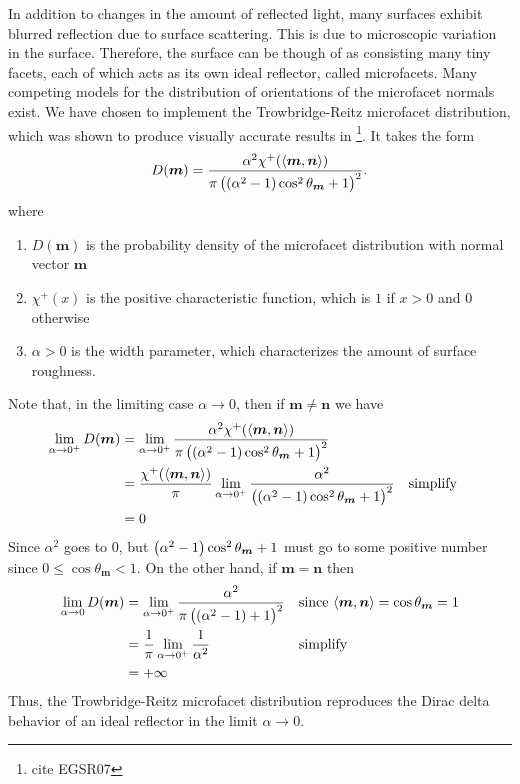\documentclass[12pt]{article}
\DeclarePairedDelimiter\ip{\langle }{\rangle}
\begin{document}
In addition to changes in the amount of reflected light, many surfaces exhibit blurred reflection due to surface scattering.
This is due to microscopic variation in the surface.
Therefore, the surface can be though of as consisting many tiny facets, each of which acts as its own ideal reflector, called microfacets.
Many competing models for the distribution of orientations of the microfacet normals exist.
We have chosen to implement the Trowbridge-Reitz microfacet distribution, which was shown to produce visually accurate results in \footnote{cite EGSR07}.
It takes the form
\[D(\bm m) = \frac{\alpha^2 \chi^+(\ip{\bm m, \bm n})}{\pi\del{\del{\alpha^2 - 1}\cos^2 \theta_{\bm m} + 1}^2}.\]
where
\begin{enumerate}
\item \(D(\bm m)\) is the probability density of the microfacet distribution with normal vector \(\bm m\)
\item \(\chi^+(x)\) is the positive characteristic function, which is \(1\) if \(x>0\) and \(0\) otherwise
\item \(\alpha > 0\) is the width parameter, which characterizes the amount of surface roughness.
\end{enumerate}
Note that, in the limiting case \(\alpha \to 0\), then if \(\bm m \neq \bm n\) we have
\begin{align*}
  \lim_{\alpha \to 0^+}D(\bm m)
  &= \lim_{\alpha \to 0^+}\frac{\alpha^2 \chi^+(\ip{\bm m, \bm n})}{\pi\del{\del{\alpha^2 - 1}\cos^2 \theta_{\bm m} + 1}^2}\\
  &= \frac{ \chi^+(\ip{\bm m, \bm n})}{\pi}\lim_{\alpha \to 0^+}\frac{\alpha^2}{\del{\del{\alpha^2 - 1}\cos^2 \theta_{\bm m} + 1}^2} && \text{simplify}\\
  &= 0
\end{align*}
Since \(\alpha^2\) goes to \(0\), but \(\del{\alpha^2 - 1}\cos^2 \theta_{\bm m} + 1\) must go to some positive number since \(0 \leq \cos\theta_{\bm m} < 1\).
On the other hand, if \(\bm m = \bm n\) then
\begin{align*}
  \lim_{\alpha \to 0}D(\bm m)
  &= \lim_{\alpha \to 0^+}\frac{\alpha^2}{\pi\del{\del{\alpha^2 - 1} + 1}^2} && \text{since \(\ip{\bm m, \bm n} = \cos \theta_{\bm m} = 1\)}\\
  &= \frac{1}{\pi}\lim_{\alpha \to 0^+}\frac{1}{\alpha^2} && \text{simplify}\\
  &= +\infty
\end{align*}
Thus, the Trowbridge-Reitz microfacet distribution reproduces the Dirac delta behavior of an ideal reflector in the limit \(\alpha \to 0\).
\end{document}
